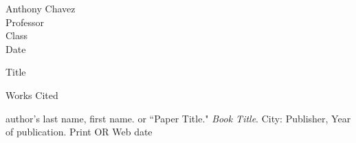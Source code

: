 \documentclass[12pt]{article}
\newcommand{\bibent}{\noindent \hangindent 40pt}
\newenvironment{workscited}{\newpage \begin{center} Works Cited \end{center}}{\newpage }
\begin{document}
\begin{flushleft}

Anthony Chavez\\
Professor\\
Class\\
Date\\

\begin{center}
Title
\end{center}


\setlength{\parindent}{0.5in}



\begin{workscited}

\bibent
author's last name, first name.  or ``Paper Title."  \textit{Book Title}.  City: Publisher, Year of publication. Print OR Web date

\end{workscited}

\end{flushleft}
\end{document}
